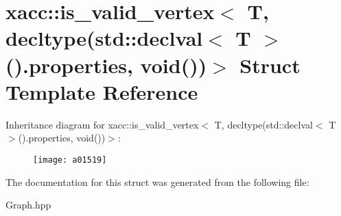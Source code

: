 \hypertarget{a01519}{}\section{xacc\+:\+:is\+\_\+valid\+\_\+vertex$<$ T, decltype(std\+:\+:declval$<$ T $>$().properties, void())$>$ Struct Template Reference}
\label{a01519}
Inheritance diagram for xacc\+:\+:is\+\_\+valid\+\_\+vertex$<$ T, decltype(std\+:\+:declval$<$ T $>$().properties, void())$>$\+:\begin{figure}[H]
\begin{center}
\leavevmode
\texttt{[image: a01519]}
\end{center}
\end{figure}


The documentation for this struct was generated from the following file\+:\begin{DoxyCompactItemize}
\item 
Graph.\+hpp\end{DoxyCompactItemize}
